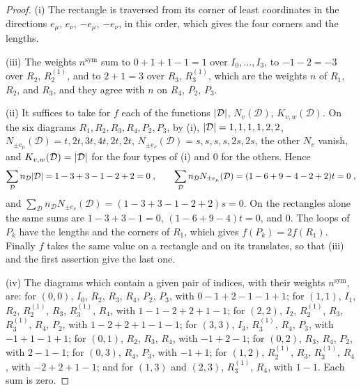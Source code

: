 \documentclass[11pt]{preprint}
\DeclarePairedDelimiter{\abs}{\lvert}{\rvert}
\numberwithin{equation}{section}
\theoremstyle{definition}
\theoremstyle{remark}
\theoremstyle{plain}
\begin{document}
\begin{proof}
(i) The rectangle is traversed from its corner of least coordinates in the directions $e_\mu$, $e_\nu$, $-e_\mu$, $-e_\nu$, in this order, which gives the four corners and the lengths.

(iii) The weights $n^{\mathrm{sym}}$ sum to $0 + 1 + 1 - 1 = 1$ over $I_0, \dots, I_3$, to $-1 - 2 = -3$ over $R_2$, $R^{(1)}_2$, and to $2 + 1 = 3$ over $R_3$, $R^{(1)}_3$, which are the weights $n$ of $R_1$, $R_2$, and $R_3$, and they agree with $n$ on $R_4$, $P_2$, $P_3$.

(ii) It suffices to take for $f$ each of the functions $\abs{\mathcal D}$, $N_v(\mathcal D)$, $K_{v,w}(\mathcal D)$. On the six diagrams $R_1, R_2, R_3, R_4, P_2, P_3$, by (i), $\abs{\mathcal D} = 1, 1, 1, 1, 2, 2$, $N_{\pm e_\mu}(\mathcal D) = t, 2t, 3t, 4t, 2t, 2t$, $N_{\pm e_\nu}(\mathcal D) = s, s, s, s, 2s, 2s$, the other $N_v$ vanish, and $K_{v,w}(\mathcal D) = \abs{\mathcal D}$ for the four types of (i) and $0$ for the others. Hence
\begin{equation}\label{eq:count-sums}
    \sum_{\mathcal D}n_{\mathcal D}\abs{\mathcal D} = 1 - 3 + 3 - 1 - 2 + 2 = 0\;,
    \qquad
    \sum_{\mathcal D}n_{\mathcal D}N_{\pm e_\mu}(\mathcal D) = (1 - 6 + 9 - 4 - 2 + 2)t = 0\;,
\end{equation}
and $\sum_{\mathcal D}n_{\mathcal D}N_{\pm e_\nu}(\mathcal D) = (1 - 3 + 3 - 1 - 2 + 2)s = 0$. On the rectangles alone the same sums are $1 - 3 + 3 - 1 = 0$, $(1 - 6 + 9 - 4)t = 0$, and $0$. The loops of $P_k$ have the lengths and the corners of $R_1$, which gives $f(P_k) = 2f(R_1)$. Finally $f$ takes the same value on a rectangle and on its translates, so that (iii) and the first assertion give the last one.

(iv) The diagrams which contain a given pair of indices, with their weights $n^{\mathrm{sym}}$, are: for $(0, 0)$, $I_0$, $R_2$, $R_3$, $R_4$, $P_2$, $P_3$, with $0 - 1 + 2 - 1 - 1 + 1$; for $(1, 1)$, $I_1$, $R_2$, $R^{(1)}_2$, $R_3$, $R^{(1)}_3$, $R_4$, with $1 - 1 - 2 + 2 + 1 - 1$; for $(2, 2)$, $I_2$, $R^{(1)}_2$, $R_3$, $R^{(1)}_3$, $R_4$, $P_2$, with $1 - 2 + 2 + 1 - 1 - 1$; for $(3, 3)$, $I_3$, $R^{(1)}_3$, $R_4$, $P_3$, with $-1 + 1 - 1 + 1$; for $(0, 1)$, $R_2$, $R_3$, $R_4$, with $-1 + 2 - 1$; for $(0, 2)$, $R_3$, $R_4$, $P_2$, with $2 - 1 - 1$; for $(0, 3)$, $R_4$, $P_3$, with $-1 + 1$; for $(1, 2)$, $R^{(1)}_2$, $R_3$, $R^{(1)}_3$, $R_4$, with $-2 + 2 + 1 - 1$; and for $(1, 3)$ and $(2, 3)$, $R^{(1)}_3$, $R_4$, with $1 - 1$. Each sum is zero.
\end{proof}
\end{document}
